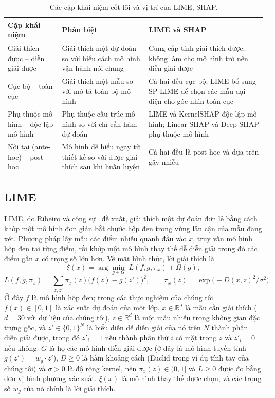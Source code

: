 \documentclass[11pt,a4paper]{article}
\begin{document}
\begin{table}[!htb]
\centering\small
\caption{Các cặp khái niệm cốt lõi và vị trí của LIME, SHAP.}\label{tab:concepts}
\begin{tabularx}{\textwidth}{L{3.3cm}XX}
\toprule
\textbf{Cặp khái niệm} & \textbf{Phân biệt} & \textbf{LIME và SHAP}\\
\midrule
Giải thích được -- diễn giải được & Giải thích một dự đoán so với hiểu cách mô hình vận hành nói chung & Cung cấp tính giải thích được; không làm cho mô hình trở nên diễn giải được\\
Cục bộ -- toàn cục & Giải thích một mẫu so với mô tả toàn bộ mô hình & Cả hai đều cục bộ; LIME bổ sung SP-LIME để chọn các mẫu đại diện cho góc nhìn toàn cục \cite{ribeiro}\\
Phụ thuộc mô hình -- độc lập mô hình & Phụ thuộc cấu trúc mô hình so với chỉ cần hàm dự đoán & LIME và KernelSHAP độc lập mô hình; Linear SHAP và Deep SHAP phụ thuộc mô hình \cite{lundberg}\\
Nội tại (ante-hoc) -- post-hoc & Mô hình dễ hiểu ngay từ thiết kế so với được giải thích sau khi huấn luyện & Cả hai đều là post-hoc và dựa trên gây nhiễu \cite{mersha}\\
\bottomrule
\end{tabularx}
\end{table}

\subsection{LIME}\label{sec:lime}
LIME, do Ribeiro và cộng sự~\cite{ribeiro} đề xuất, giải thích một dự đoán
đơn lẻ bằng cách khớp một mô hình đơn giản bắt chước hộp đen trong vùng lân
cận của mẫu đang xét. Phương pháp lấy mẫu các điểm nhiễu quanh đầu vào $x$,
truy vấn mô hình hộp đen tại từng điểm, rồi khớp một mô hình thay thế dễ diễn
giải trong đó các điểm gần $x$ có trọng số lớn hơn. Về mặt hình thức, lời
giải thích là
\begin{equation}\label{eq:lime}
\xi(x) = \arg\min_{g \in G} \; L(f, g, \pi_x) + \Omega(g),
\end{equation}
\begin{equation}\label{eq:limeloss}
L(f, g, \pi_x) = \sum_{z, z'} \pi_x(z) \big( f(z) - g(z') \big)^2, \qquad \pi_x(z) = \exp\!\big( -D(x, z)^2 / \sigma^2 \big).
\end{equation}
Ở đây $f$ là mô hình hộp đen; trong các thực nghiệm của chúng tôi
$f(x) \in [0,1]$ là xác suất dự đoán của một lớp. $x \in \mathbb{R}^d$ là mẫu
cần giải thích ($d = 30$ với dữ liệu của chúng tôi), $z \in \mathbb{R}^d$ là
một mẫu nhiễu trong không gian đặc trưng gốc, và $z' \in \{0,1\}^N$ là biểu
diễn dễ diễn giải của nó trên $N$ thành phần diễn giải được, trong đó
$z'_i = 1$ nếu thành phần thứ $i$ có mặt trong $z$ và $z'_i = 0$ nếu không.
$G$ là họ các mô hình diễn giải được (ở đây là mô hình tuyến tính
$g(z') = w_g \cdot z'$), $D \geq 0$ là hàm khoảng cách (Euclid trong ví dụ
tính tay của chúng tôi) và $\sigma > 0$ là độ rộng kernel, nên
$\pi_x(z) \in (0, 1]$ và $L \geq 0$ được đo bằng đơn vị bình phương xác suất.
$\xi(x)$ là mô hình thay thế được chọn, và các trọng số $w_g$ của nó chính là
lời giải thích.
\end{document}
